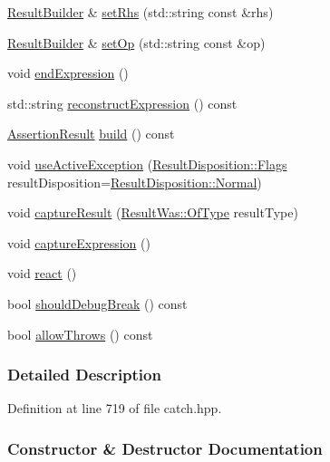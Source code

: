 \begin{DoxyCompactItemize}
\item 
\hyperlink{a00067}{Result\+Builder} \& \hyperlink{a00067_aaeb41a00cf352c7a0bcf75a0ded0a4a2}{set\+Rhs} (std\+::string const \&rhs)
\item 
\hyperlink{a00067}{Result\+Builder} \& \hyperlink{a00067_a8232ed051ed7f6adfbc152c98aa1dc0c}{set\+Op} (std\+::string const \&op)
\item 
void \hyperlink{a00067_a75ac2dbabd8d4b4b3a75de9bbc3abf02}{end\+Expression} ()
\item 
std\+::string \hyperlink{a00067_ad34bc9b83d5cbd5d960903e5a3c6c96c}{reconstruct\+Expression} () const 
\item 
\hyperlink{a00005}{Assertion\+Result} \hyperlink{a00067_a31eba48feb02817d2151e31bd8331eeb}{build} () const 
\item 
void \hyperlink{a00067_a5bbd2f14a678f3e8d0f791ac6d233d65}{use\+Active\+Exception} (\hyperlink{a00068_a3396cad6e2259af326b3aae93e23e9d8}{Result\+Disposition\+::\+Flags} result\+Disposition=\hyperlink{a00068_a3396cad6e2259af326b3aae93e23e9d8af3bd52347ed6f8796e8ce2f77bb39ea5}{Result\+Disposition\+::\+Normal})
\item 
void \hyperlink{a00067_a10e467f7b7a4976e5d148b4d5066e8fd}{capture\+Result} (\hyperlink{a00069_a624e1ee3661fcf6094ceef1f654601ef}{Result\+Was\+::\+Of\+Type} result\+Type)
\item 
void \hyperlink{a00067_af2ae2343965802eeeb0abbd4ea9d2d36}{capture\+Expression} ()
\item 
void \hyperlink{a00067_a3085cdc46533d45bed6f652a2ac295c0}{react} ()
\item 
bool \hyperlink{a00067_a34cdbf7ad1e5b3cb4a94047f2d14bcb2}{should\+Debug\+Break} () const 
\item 
bool \hyperlink{a00067_a3dbf18a3a4b00173dab052a8864e435e}{allow\+Throws} () const 
\end{DoxyCompactItemize}


\subsubsection{Detailed Description}


Definition at line 719 of file catch.\+hpp.



\subsubsection{Constructor \& Destructor Documentation}
\hypertarget{a00067_a18c2929702bdde1f835e39717a0e554b}{}
